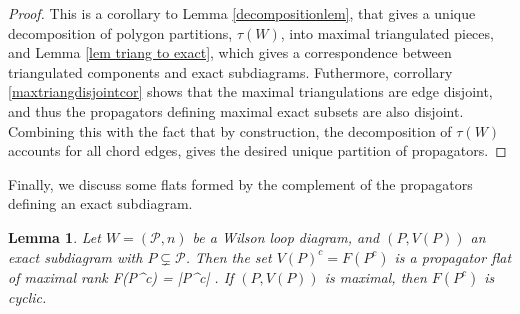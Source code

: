 \documentclass[11pt]{article}
\newcommand{\rk}{\textrm{rk}}
\def\bas #1\eas{\begin{align*} #1 \end{align*}}
\newcommand{\cP}{\mathcal{P}}
\newtheorem{lem}[thm]{Lemma}
\theoremstyle{remark}
\theoremstyle{definition}
\begin{document}
\begin{proof}
This is a corollary to Lemma \ref{decompositionlem}, that gives a unique decomposition of polygon partitions, $\tau(W)$,  into maximal triangulated pieces, and Lemma \ref{lem triang to exact}, which gives a correspondence between triangulated components and exact subdiagrams. Futhermore, corrollary \ref{maxtriangdisjointcor} shows that the maximal triangulations are edge disjoint, and thus the propagators defining maximal exact subsets are also disjoint. Combining this with the fact that by construction, the decomposition of $\tau(W)$ accounts for all chord edges, gives the desired unique partition of propagators.
\end{proof}

Finally, we discuss some flats formed by the complement of the propagators defining an exact subdiagram.

\begin{lem} \label{maxexactcomplementrank}
Let $W = (\cP, n)$ be a Wilson loop diagram, and $(P, V(P))$ an exact subdiagram with $P \subsetneq \cP$. Then the set $V(P)^c = F(P^c)$ is a propagator flat of maximal rank  \bas \rk F(P^c) = |P^c| \;. \eas If $(P, V(P))$ is maximal, then $F(P^c)$ is cyclic.
\end{lem}
\end{document}
